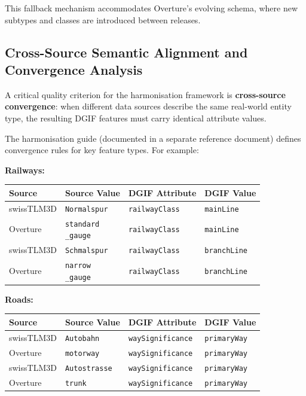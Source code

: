 \documentclass[conference]{IEEEtran}
\begin{document}
This fallback mechanism accommodates Overture's evolving schema, where new subtypes and classes are introduced between releases.

\subsection{Cross-Source Semantic Alignment and Convergence Analysis}

A critical quality criterion for the harmonisation framework is \textbf{cross-source convergence}: when different data sources describe the same real-world entity type, the resulting DGIF features must carry identical attribute values.

The harmonisation guide (documented in a separate reference document) defines convergence rules for key feature types. For example:

\textbf{Railways:}

\begin{center}
\begin{longtable}{p{}p{}p{}p{}}
Source & Source Value & DGIF Attribute & DGIF Value \\
\midrule
swissTLM3D & \texttt{Normalspur} & \texttt{railwayClass} & \texttt{mainLine} \\
Overture & \texttt{standard\\_gauge} & \texttt{railwayClass} & \texttt{mainLine} \\
swissTLM3D & \texttt{Schmalspur} & \texttt{railwayClass} & \texttt{branchLine} \\
Overture & \texttt{narrow\\_gauge} & \texttt{railwayClass} & \texttt{branchLine} \\
\end{longtable}
\end{center}


\textbf{Roads:}

\begin{center}
\begin{longtable}{p{}p{}p{}p{}}
Source & Source Value & DGIF Attribute & DGIF Value \\
\midrule
swissTLM3D & \texttt{Autobahn} & \texttt{waySignificance} & \texttt{primaryWay} \\
Overture & \texttt{motorway} & \texttt{waySignificance} & \texttt{primaryWay} \\
swissTLM3D & \texttt{Autostrasse} & \texttt{waySignificance} & \texttt{primaryWay} \\
Overture & \texttt{trunk} & \texttt{waySignificance} & \texttt{primaryWay} \\
\end{longtable}
\end{center}
\end{document}
